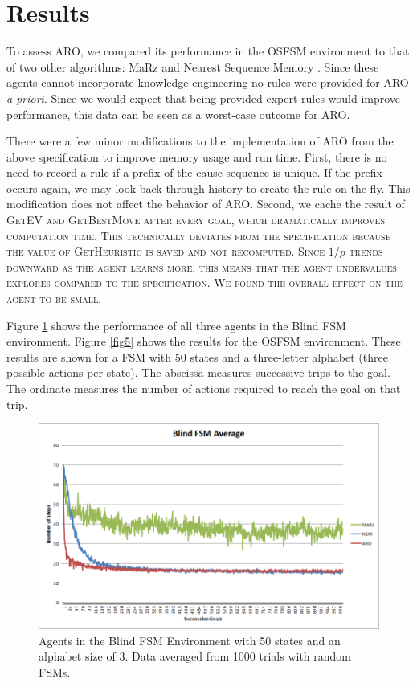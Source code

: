 \documentclass[letterpaper]{article} %
\begin{document}
\section{Results}

To assess ARO, we compared its performance in the OSFSM environment to
that of two other algorithms: MaRz \cite{Rodriguez17} and Nearest
Sequence Memory \cite{McCallumNSM95}. Since these agents cannot incorporate knowledge engineering no rules were provided for ARO \textit{a priori}. Since we would expect that being provided expert rules would improve performance, this data can be seen as a worst-case outcome for ARO.

There were a few minor modifications to the implementation of ARO from
the above specification to improve memory usage and run time. First,
there is no need to record a rule if a prefix of the cause sequence is
unique. If the prefix occurs again, we may look back through history
to create the rule on the fly. This modification does not affect the
behavior of ARO. Second, we cache the result of \scshape
GetEV \normalfont and \scshape GetBestMove \normalfont after every
goal, which dramatically improves computation time. This technically
deviates from the specification because the value of \scshape
GetHeuristic \normalfont is saved and not recomputed. Since $1/p$
trends downward as the agent learns more, this means that the agent
undervalues explores compared to the specification. We found the
overall effect on the agent to be small.

Figure \ref{fig4} shows the performance of all three agents in the
Blind FSM environment.  Figure \ref{fig5} shows the results for the
OSFSM environment.  These results are shown for a FSM with 50 states
and a three-letter alphabet (three possible actions per state).  The
abscissa measures successive trips to the goal.  The ordinate measures
the number of actions required to reach the goal on that trip.

\begin{figure}[t]
  \centering
  \includegraphics[width=0.9\columnwidth]{BlindFSMGraph.png} %
  \caption{Agents in the Blind FSM Environment with 50 states and an alphabet size of 3. Data averaged from 1000 trials with random FSMs.}
  \label{fig4}
\end{figure}
\end{document}
